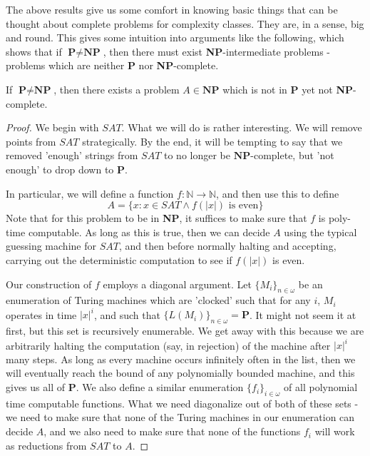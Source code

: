 \par The above results give us some comfort in knowing basic things that can be thought about complete problems for complexity classes. They are, in a sense, big and round. This gives some intuition into arguments like the following, which shows that if $\textbf{P} \neq \textbf{NP}$, then there must exist \textbf{NP}-intermediate problems - problems which are neither \textbf{P} nor \textbf{NP}-complete.
\begin{theorem}
	If $\textbf{P} \neq \textbf{NP}$, then there exists a problem $A \in \textbf{NP}$ which is not in \textbf{P} yet not \textbf{NP}-complete.
\end{theorem}
\begin{proof}
	We begin with $SAT$. What we will do is rather interesting. We will remove points from $SAT$ strategically. By the end, it will be tempting to say that we removed 'enough' strings from $SAT$ to no longer be $\textbf{NP}$-complete, but 'not enough' to drop down to \textbf{P}.
	\par In particular, we will define a function $f:\mathbb{N} \to \mathbb{N}$, and then use this to define 
	\[ A = \{x: x \in SAT \wedge f(|x|) \textrm{ is even}\}  \] 
	Note that for this problem to be in \textbf{NP}, it suffices to make sure that $f$ is poly-time computable. As long as this is true, then we can decide $A$ using the typical guessing machine for $SAT$, and then before normally halting and accepting, carrying out the deterministic computation to see if $f(|x|)$ is even.
	\par Our construction of $f$ employs a diagonal argument. Let $\{M_i\}_{n \in \omega}$ be an enumeration of Turing machines which are 'clocked' such that for any $i$, $M_i$ operates in time $|x|^i$, and such that $\{L(M_i)\}_{n \in \omega} = \textbf{P}$. It might not seem it at first, but this set is recursively enumerable. We get away with this because we are arbitrarily halting the computation (say, in rejection) of the machine after $|x|^i$ many steps. As long as every machine occurs infinitely often in the list, then we will eventually reach the bound of any polynomially bounded machine, and this gives us all of \textbf{P}. We also define a similar enumeration $\{f_i\}_{i \in \omega}$ of all polynomial time computable functions. What we need diagonalize out of both of these sets - we need to make sure that none of the Turing machines in our enumeration can decide $A$, and we also need to make sure that none of the functions $f_i$ will work as reductions from $SAT$ to $A$.

\end{proof}
